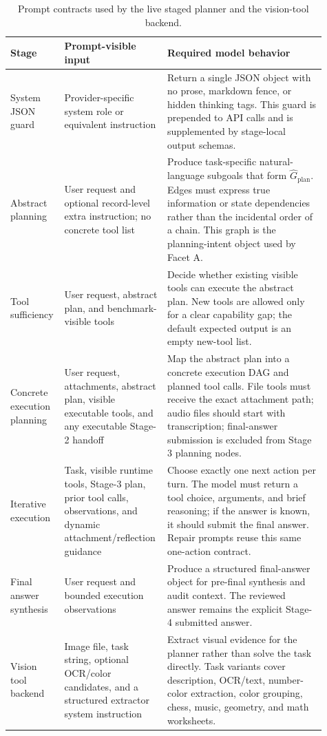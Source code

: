 \documentclass{article}
\begin{document}
\begin{table}[H]
\centering
\scriptsize
\setlength{\tabcolsep}{4pt}
\begin{tabular}{p{0.15\linewidth}p{0.27\linewidth}p{0.49\linewidth}}
\toprule
Stage & Prompt-visible input & Required model behavior \\
\midrule
System JSON guard & Provider-specific system role or equivalent instruction & Return a single JSON object with no prose, markdown fence, or hidden thinking tags. This guard is prepended to API calls and is supplemented by stage-local output schemas. \\
Abstract planning & User request and optional record-level extra instruction; no concrete tool list & Produce task-specific natural-language subgoals that form $\widehat{G}_{\text{plan}}$. Edges must express true information or state dependencies rather than the incidental order of a chain. This graph is the planning-intent object used by Facet A. \\
Tool sufficiency & User request, abstract plan, and benchmark-visible tools & Decide whether existing visible tools can execute the abstract plan. New tools are allowed only for a clear capability gap; the default expected output is an empty new-tool list. \\
Concrete execution planning & User request, attachments, abstract plan, visible executable tools, and any executable Stage-2 handoff & Map the abstract plan into a concrete execution DAG and planned tool calls. File tools must receive the exact attachment path; audio files should start with transcription; final-answer submission is excluded from Stage 3 planning nodes. \\
Iterative execution & Task, visible runtime tools, Stage-3 plan, prior tool calls, observations, and dynamic attachment/reflection guidance & Choose exactly one next action per turn. The model must return a tool choice, arguments, and brief reasoning; if the answer is known, it should submit the final answer. Repair prompts reuse this same one-action contract. \\
Final answer synthesis & User request and bounded execution observations & Produce a structured final-answer object for pre-final synthesis and audit context. The reviewed answer remains the explicit Stage-4 submitted answer. \\
Vision tool backend & Image file, task string, optional OCR/color candidates, and a structured extractor system instruction & Extract visual evidence for the planner rather than solve the task directly. Task variants cover description, OCR/text, number-color extraction, color grouping, chess, music, geometry, and math worksheets. \\
\bottomrule
\end{tabular}
\vspace{0.1cm}
\caption{Prompt contracts used by the live staged planner and the vision-tool backend.}
\label{tab:appendix-prompt-contracts}
\end{table}
\end{document}
